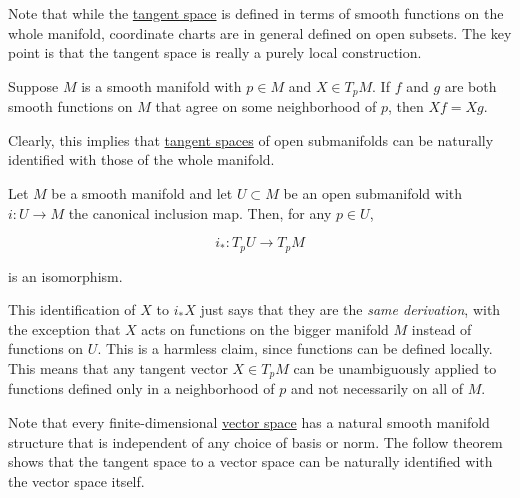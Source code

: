 \documentclass{article}
\newcounter{theorem}[section]
\begin{document}
    Note that while the \hyperref[mv-def:tangent-space]{tangent space} is defined in terms of smooth functions on the whole manifold, coordinate charts are in general defined on open subsets. The key point is that the tangent space is really a purely local construction. 

    \begin{theorem}
      \label{thm:derivations-depend-only-on-a-neighbourhood}
      Suppose $M$ is a smooth manifold with $p \in M$ and $X \in T_p M$. If $f$ and $g$ are both smooth functions on $M$ that agree on some neighborhood of $p$, then $X f = X g$. 
    \end{theorem}

    Clearly, this implies that \hyperref[mv-def:tangent-space]{tangent spaces} of open submanifolds can be naturally identified with those of the whole manifold. 

    \begin{theorem}
      \label{thm:tangent-space-of-an-open-submanifold}
      Let $M$ be a smooth manifold and let $U \subset M$ be an open submanifold with $i: U \to M$ the canonical inclusion map. Then, for any $p \in U$, 

        \begin{equation}
          i_* : T_p U \to T_p M
        \end{equation}

      is an isomorphism. 
    \end{theorem}

    This identification of $X$ to $i_* X$ just says that they are the \textit{same derivation}, with the exception that $X$ acts on functions on the bigger manifold $M$ instead of functions on $U$. This is a harmless claim, since functions can be defined locally. This means that any tangent vector $X \in T_p M$ can be unambiguously applied to functions defined only in a neighborhood of $p$ and not necessarily on all of $M$. 

    Note that every finite-dimensional \hyperref[lin-def:vector-space]{vector space} has a natural smooth manifold structure that is independent of any choice of basis or norm. The follow theorem shows that the tangent space to a vector space can be naturally identified with the vector space itself. 
\end{document}
